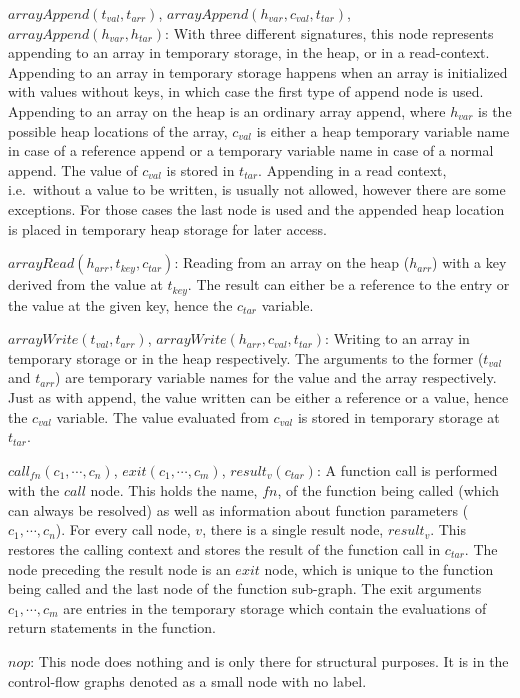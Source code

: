\begin{description}
\item{$\mathit{arrayAppend}(t_{val}, t_{arr})$, $\mathit{arrayAppend}(h_{var}, c_{val}, t_{tar})$, $\mathit{arrayAppend}(h_{var}, h_{tar})$:} With three different signatures, this node represents appending to an array in temporary storage, in the heap, or in a read-context. Appending to an array in temporary storage happens when an array is initialized with values without keys, in which case the first type of append node is used. Appending to an array on the heap is an ordinary array append, where $h_{var}$ is the possible heap locations of the array, $c_{val}$ is either a heap temporary variable name in case of a reference append or a temporary variable name in case of a normal append. The value of $c_{val}$ is stored in $t_{tar}$. Appending in a read context, i.e.\ without a value to be written, is usually not allowed, however there are some exceptions. For those cases the last node is used and the appended heap location is placed in temporary heap storage for later access.
\item{$\mathit{arrayRead}(h_{arr}, t_{key}, c_{tar})$:} Reading from an array on the heap ($h_{arr}$) with a key derived from the value at $t_{key}$. The result can either be a reference to the entry or the value at the given key, hence the $c_{tar}$ variable. 
\item{$\mathit{arrayWrite}(t_{val}, t_{arr})$, $\mathit{arrayWrite}(h_{arr}, c_{val}, t_{tar})$:} Writing to an array in temporary storage or in the heap respectively. The arguments to the former ($t_{val}$ and $t_{arr}$) are temporary variable names for the value and the array respectively. Just as with append, the value written can be either a reference or a value, hence the $c_{val}$ variable. The value evaluated from $c_{val}$ is stored in temporary storage at $t_{tar}$.
\item{$\mathit{call}_{\mathit{fn}}(c_1, \cdots, c_n)$, $\mathit{exit}(c_1, \cdots, c_m)$, $\mathit{result}_{v}(c_{tar})$:} A function call is performed with the $\mathit{call}$ node. This holds the name, $\mathit{fn}$, of the function being called (which can always be resolved) as well as information about function parameters ($c_1, \cdots, c_n$). For every call node, $v$, there is a single result node, $\mathit{result}_v$. This restores the calling context and stores the result of the function call in $c_{tar}$. The node preceding the result node is an $\mathit{exit}$ node, which is unique to the function being called and the last node of the function sub-graph. The exit arguments $c_1, \cdots, c_m$ are entries in the temporary storage which contain the evaluations of return statements in the function.
\item{$nop$:} This node does nothing and is only there for structural purposes. It is in the control-flow graphs denoted as a small node with no label.
\end{description}

